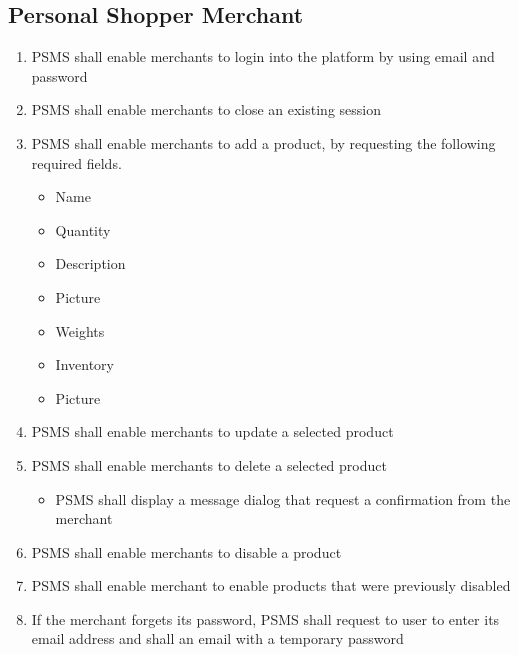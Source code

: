 \subsection{Personal Shopper Merchant}
\begin{enumerate}[resume, label=SY-\arabic*]
    \item PSMS shall enable merchants to login into the platform by 
    using email and password
    \item PSMS shall enable merchants to close an existing session
    \item PSMS shall enable merchants to add a product, by requesting the 
    following required fields.
    \begin{itemize}
        \item Name
        \item Quantity
        \item Description
        \item Picture
        \item Weights 
        \item Inventory
        \item Picture
    \end{itemize}
    \item PSMS shall enable merchants to update a selected product
    \item PSMS shall enable merchants to delete a selected product
    \begin{itemize}
        \item PSMS shall display a message dialog that request a confirmation 
        from the merchant
    \end{itemize}
    \item PSMS shall enable merchants to disable a product
    \item PSMS shall enable merchant to enable products that were 
    previously disabled
    \item If the merchant forgets its password, PSMS shall request to user 
    to enter its email address and shall an email with a temporary password
\end{enumerate}
\pagebreak
